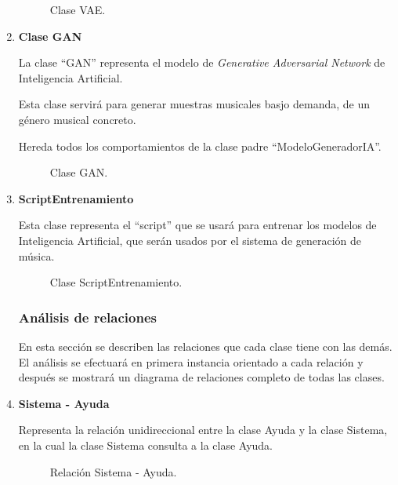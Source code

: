 \begin{enumerate}
  \begin{figure}[H]
    \centering
    
    \caption{Clase VAE.}
  \end{figure}

  \item \textbf{Clase GAN}

  La clase ``GAN'' representa el modelo de \emph{Generative Adversarial Network} de Inteligencia Artificial.

  Esta clase servirá para generar muestras musicales basjo demanda, de un género musical concreto.

  Hereda todos los comportamientos de la clase padre ``ModeloGeneradorIA''.

  \begin{figure}[H]
    \centering
    
    \caption{Clase GAN.}
  \end{figure}

  \item \textbf{ScriptEntrenamiento}

  Esta clase representa el ``script'' que se usará para entrenar los modelos de Inteligencia Artificial, que serán usados por el sistema de generación de música.

  \begin{figure}[H]
    \centering
    
    \caption{Clase ScriptEntrenamiento.}
  \end{figure}


  \subsubsection{Análisis de relaciones}

  En esta sección se describen las relaciones que cada clase tiene con las demás. El análisis se efectuará en primera instancia orientado a cada relación y después se mostrará un diagrama de relaciones completo de todas las clases.

  \item \textbf{Sistema - Ayuda}

  Representa la relación unidireccional entre la clase Ayuda y la
  clase Sistema, en la cual la clase Sistema consulta a la clase
  Ayuda.

  \begin{figure}[H]
    \centering
    
    \caption{Relación Sistema - Ayuda.}
  \end{figure}


\end{enumerate}
